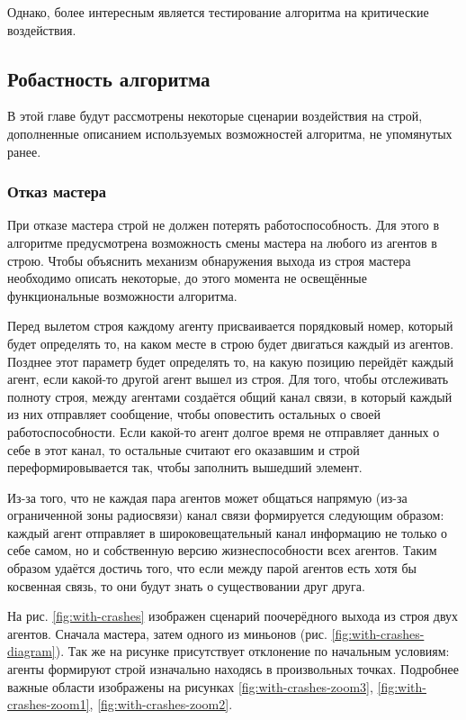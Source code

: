 \documentclass[a4paper, 14pt]{extarticle}
\let\Oldsubsection\subsection
\renewcommand{\subsection}{\FloatBarrier\Oldsubsection}
\let\Oldsubsubsection\subsubsection
\renewcommand{\subsubsection}{\FloatBarrier\Oldsubsubsection}
\begin{document}
Однако, более интересным является тестирование алгоритма на критические воздействия.
\subsection{Робастность алгоритма}
В этой главе будут рассмотрены некоторые сценарии воздействия на строй, дополненные описанием используемых возможностей алгоритма, не упомянутых ранее.
\subsubsection{Отказ мастера}
При отказе мастера строй не должен потерять работоспособность. Для этого в алгоритме предусмотрена возможность смены мастера на любого из агентов в строю. Чтобы объяснить механизм обнаружения выхода из строя мастера необходимо описать некоторые, до этого момента не освещённые функциональные возможности алгоритма. \par
Перед вылетом строя каждому агенту присваивается порядковый номер, который будет определять то, на каком месте в строю будет двигаться каждый из агентов. Позднее этот параметр будет определять то, на какую позицию перейдёт каждый агент, если какой-то другой агент вышел из строя. Для того, чтобы отслеживать полноту строя, между агентами создаётся общий канал связи, в который каждый из них отправляет сообщение, чтобы оповестить остальных о своей работоспособности. Если какой-то агент долгое время не отправляет данных о себе в этот канал, то остальные считают его оказавшим и строй переформировывается так, чтобы заполнить вышедший элемент. \par
Из-за того, что не каждая пара агентов может общаться напрямую (из-за ограниченной зоны радиосвязи) канал связи формируется следующим образом: каждый агент отправляет в широковещательный канал информацию не только о себе самом, но и собственную версию жизнеспособности всех агентов. Таким образом удаётся достичь того, что если между парой агентов есть хотя бы косвенная связь, то они будут знать о существовании друг друга.\par
\bigskip
На рис. \ref{fig:with-crashes} изображен сценарий поочерёдного выхода из строя двух агентов. Сначала мастера, затем одного из миньонов (рис. \ref{fig:with-crashes-diagram}). Так же на рисунке присутствует отклонение по начальным условиям: агенты формируют строй изначально находясь в произвольных точках. Подробнее важные области изображены на рисунках \ref{fig:with-crashes-zoom3}, \ref{fig:with-crashes-zoom1}, \ref{fig:with-crashes-zoom2}. \par
\end{document}
